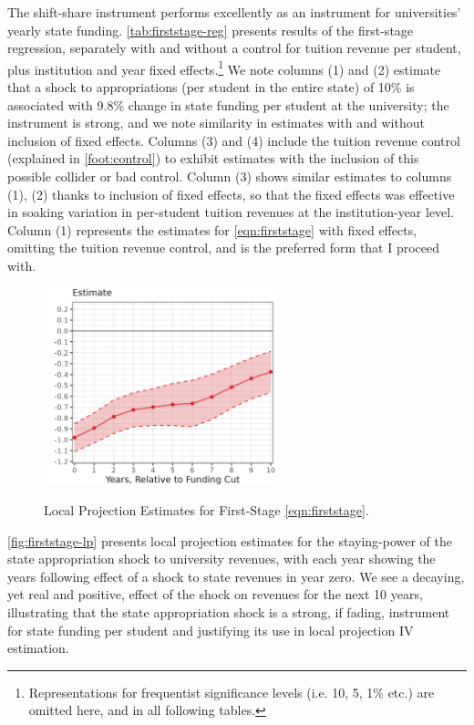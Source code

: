 The shift-share instrument performs excellently as an instrument for universities' yearly state funding.
\autoref{tab:firststage-reg} presents results of the first-stage regression, separately with and without a control for tuition revenue per student, plus institution and year fixed effects.\footnote{
    Representations for frequentist significance levels (i.e. 10, 5, 1\% etc.) are omitted here, and in all following tables.
}
We note columns (1) and (2) estimate that a shock to appropriations (per student in the entire state) of 10\% is associated with 9.8\% change in state funding per student at the university; the instrument is strong, and we note similarity in estimates with and without inclusion of fixed effects.
Columns (3) and (4) include the tuition revenue control (explained in \autoref{foot:control}) to exhibit estimates with the inclusion of this possible collider or bad control.
Column (3) shows similar estimates to columns (1), (2) thanks to inclusion of fixed effects, so that the fixed effects was effective in soaking variation in per-student tuition revenues at the institution-year level.
Column (1) represents the estimates for \autoref{eqn:firststage} with fixed effects, omitting the tuition revenue control, and is the preferred form that I proceed with.

\begin{figure}[h!]
    \centering
    \singlespacing
    \caption{Local Projection Estimates for First-Stage \autoref{eqn:firststage}.}
    \includegraphics[width=0.6\textwidth]{figures/firststage-lp.png}
    \label{fig:firststage-lp}
\end{figure}

\autoref{fig:firststage-lp} presents local projection estimates for the staying-power of the state appropriation shock to university revenues, with each year showing the years following effect of a shock to state revenues in year zero.
We see a decaying, yet real and positive, effect of the shock on revenues for the next 10 years, illustrating that the state appropriation shock is a strong, if fading, instrument for state funding per student and justifying its use in local projection IV estimation.


